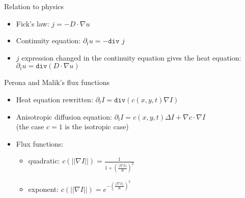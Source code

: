 \documentclass[aspectratio=169,xcolor=dvipsnames]{beamer}
\begin{document}
\begin{frame}{Relation to physics}
    \begin{itemize}
        \pause
        \item Fick's law: $j = -D\cdot\nabla u$
        \pause
        \item Continuity equation: $\partial_t u = -\texttt{div } j$
        \pause
        \item $j$ expression changed in the continuity equation gives the heat equation: $\partial_t u = \texttt{div} (D\cdot\nabla u)$
    \end{itemize}
\end{frame}

\begin{frame}{Perona and Malik's flux functions}
    \begin{itemize}
        \item Heat equation rewritten: $\partial_t I = \texttt{div} (c(x,y,t)\nabla I)$
        \pause
        \item Anisotropic diffusion equation: $\partial_t I = c(x, y, t)\Delta I+\nabla c\cdot\nabla I$\\(the case $c = 1$ is the isotropic case)
        \pause
        \item Flux functions:
        \begin{itemize}
            \item quadratic: $c(||\nabla I||) = \frac{1}{1+\left(\frac{||\nabla I||}{K}\right)^2}$
            \item exponent: $c(||\nabla I||) = e^{-\left(\frac{||\nabla I||}{K}\right)^2}$
        \end{itemize}
    \end{itemize}
\end{frame}
\end{document}
